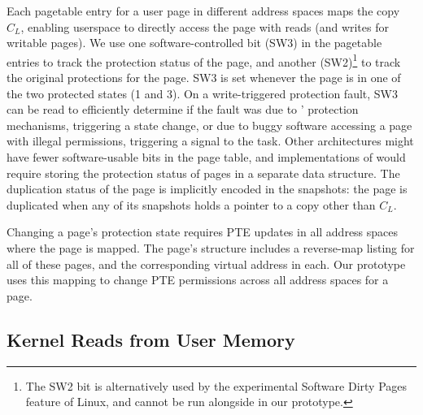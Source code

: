 Each pagetable entry for a user page in different address spaces
maps the copy $C_L$, enabling userspace to directly access the page
with reads (and writes for writable pages).
We use one software-controlled bit (SW3) in the pagetable entries
to track the protection status of the page, and another
(SW2)\footnote{The SW2 bit is alternatively used by the experimental Software Dirty Pages feature of
Linux, and cannot be run alongside \midas in our prototype.}
to track the original protections for the page.
SW3 is set whenever the page is in one of the two protected
states (1 and 3).
On a write-triggered protection fault, SW3 can be read to
efficiently determine if the fault was due to \midas' protection
mechanisms, triggering a state change, or due to buggy software
accessing a page with illegal permissions, triggering a signal to
the task.
Other architectures might have fewer software-usable
bits in the page table, and implementations of \midas would
require storing the protection status of pages in a separate data structure.
The duplication status of the page is implicitly encoded in the
snapshots: the page is duplicated when any of its snapshots
holds a pointer to a copy other than $C_L$.

Changing a page's protection state requires PTE updates
in all address spaces where the page is mapped.
The page's  structure includes a reverse-map
listing for all of these pages, and the corresponding virtual
address in each.
Our prototype uses this mapping to change PTE permissions across
all address spaces for a page.


\subsection{Kernel Reads from User Memory}

